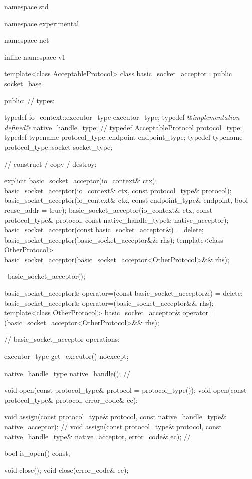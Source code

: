 \begin{codeblock}
namespace std {
namespace experimental {
namespace net {
inline namespace v1 {

  template<class AcceptableProtocol>
  class basic_socket_acceptor : public socket_base
  {
  public:
    // types:

    typedef io_context::executor_type executor_type;
    typedef @\textit{implementation defined}@ native_handle_type; // \nativeref
    typedef AcceptableProtocol protocol_type;
    typedef typename protocol_type::endpoint endpoint_type;
    typedef typename protocol_type::socket socket_type;

    // construct / copy / destroy:

    explicit basic_socket_acceptor(io_context& ctx);
    basic_socket_acceptor(io_context& ctx, const protocol_type& protocol);
    basic_socket_acceptor(io_context& ctx, const endpoint_type& endpoint,
                          bool reuse_addr = true);
    basic_socket_acceptor(io_context& ctx, const protocol_type& protocol,
                          const native_handle_type& native_acceptor);
    basic_socket_acceptor(const basic_socket_acceptor&) = delete;
    basic_socket_acceptor(basic_socket_acceptor&& rhs);
    template<class OtherProtocol>
      basic_socket_acceptor(basic_socket_acceptor<OtherProtocol>&& rhs);

    ~basic_socket_acceptor();

    basic_socket_acceptor& operator=(const basic_socket_acceptor&) = delete;
    basic_socket_acceptor& operator=(basic_socket_acceptor&& rhs);
    template<class OtherProtocol>
      basic_socket_acceptor& operator=(basic_socket_acceptor<OtherProtocol>&& rhs);

    // basic_socket_acceptor operations:

    executor_type get_executor() noexcept;

    native_handle_type native_handle(); // \nativeref

    void open(const protocol_type& protocol = protocol_type());
    void open(const protocol_type& protocol, error_code& ec);

    void assign(const protocol_type& protocol,
                const native_handle_type& native_acceptor); // \nativeref
    void assign(const protocol_type& protocol,
                const native_handle_type& native_acceptor,
                error_code& ec); // \nativeref

    bool is_open() const;

    void close();
    void close(error_code& ec);

}}}}}
\end{codeblock}
